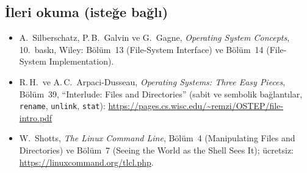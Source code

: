\documentclass[11pt,a4paper]{article}
\newcommand{\cmd}[1]{\texttt{#1}}
\begin{document}
\subsection*{İleri okuma (isteğe bağlı)}
\begin{itemize}
  \item A.\ Silberschatz, P.\,B.\ Galvin ve G.\ Gagne, \emph{Operating System Concepts}, 10.\ baskı, Wiley: Bölüm~13 (File-System Interface) ve Bölüm~14 (File-System Implementation).
  \item R.\,H.\ ve A.\,C.\ Arpaci-Dusseau, \emph{Operating Systems: Three Easy Pieces}, Bölüm~39, ``Interlude: Files and Directories'' (sabit ve sembolik bağlantılar, \cmd{rename}, \cmd{unlink}, \cmd{stat}): \url{https://pages.cs.wisc.edu/~remzi/OSTEP/file-intro.pdf}
  \item W.\ Shotts, \emph{The Linux Command Line}, Bölüm~4 (Manipulating Files and Directories) ve Bölüm~7 (Seeing the World as the Shell Sees It); ücretsiz: \url{https://linuxcommand.org/tlcl.php}.
\end{itemize}
\end{document}
